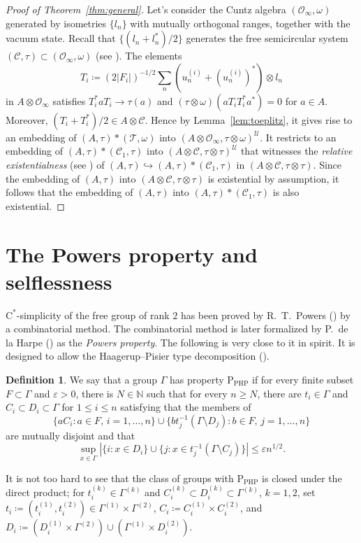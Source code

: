 \documentclass[12pt,nosumlimits,nonamelimits]{amsart}
\theoremstyle{remark}
\theoremstyle{definition}
\newtheorem*{defn}{Definition}
\newcommand{\IN}{\mathbb{N}}
\newcommand{\cC}{\mathcal{C}}
\newcommand{\cO}{\mathcal{O}}
\newcommand{\cT}{\mathcal{T}}
\newcommand{\cU}{\mathcal{U}}
\newcommand{\ve}{\varepsilon}
\newcommand{\Ga}{\Gamma}
\begin{document}
\begin{proof}[Proof of Theorem~\ref{thm:general}]
Let's consider the Cuntz algebra $(\cO_\infty,\omega)$ 
generated by isometries $\{l_n\}$ with mutually orthogonal ranges, 
together with the vacuum state. 
Recall that  $\{ (l_n+l_n^*)/2\}$ generates 
the free semicircular system 
$(\cC,\tau) \subset (\cO_\infty,\omega)$ 
(see \cite{vdn}). 
The elements 
\[
T_i \coloneq (2|F_i|)^{-1/2}\sum_n (u^{(i)}_n+(u^{(i)}_n)^*) \otimes l_n
\]
in $A\otimes\cO_\infty$ satisfies $T_i^* a T_i \to \tau(a)$ and 
$(\tau\otimes\omega)(aT_iT_i^*a^*)=0$ for $a\in A$. Moreover, 
$(T_i+T_i^*)/2\in A\otimes\cC$. 
Hence by Lemma~\ref{lem:toeplitz}, it gives rise to an embedding 
of $(A,\tau)\ast(\cT,\omega)$ into $(A\otimes\cO_\infty,\tau\otimes\omega)^\cU$.
It restricts to an embedding of 
$(A,\tau)\ast(\cC_1,\tau)$ into $(A\otimes\cC,\tau\otimes\tau)^\cU$ 
that witnesses the \emph{relative existentialness} (see \cite{robert}) 
of $(A,\tau)\hookrightarrow(A,\tau)\ast(\cC_1,\tau)$ 
in $(A\otimes\cC,\tau\otimes\tau)$. 
Since the embedding of $(A,\tau)$ into $(A\otimes\cC,\tau\otimes\tau)$ 
is existential by assumption, it follows that the embedding of $(A,\tau)$ into 
$(A,\tau)\ast(\cC_1,\tau)$ is also existential. 
\end{proof}
%
%
\section{The Powers property and selflessness}\label{sec:pow}
%
%
$\mathrm{C}^*$-simplicity of the free group of rank $2$ 
has been proved by R.~T.~Powers (\cite{powers}) by a combinatorial 
method. The combinatorial method is later formalized by 
P.~de la Harpe (\cite{delaharpe}) as 
the \emph{Powers property}. 
The following is very close to it in spirit. 
It is designed to allow the Haagerup--Pisier 
type decomposition (\cite{hp}).

\begin{defn}\label{defn:pow}
We say that a group $\Ga$ has 
property $\mathrm{P}_{\mathrm{PHP}}$ if 
for every finite subset $F\subset\Ga$ and $\ve>0$, 
there is $N\in\IN$ such that for every $n\geq N$, 
there are 
$t_i\in\Ga$ and $C_i\subset D_i\subset\Ga$ for 
$1\le i \le n$ satisfying that 
the members of 
\[
\{aC_i : a\in F,\, i=1,\ldots,n\}\cup\{ bt_j^{-1}(\Gamma\setminus D_j) : b\in F,\, j=1,\ldots,n\}
\] 
are mutually disjoint and that 
\[
\sup_{x\in\Ga} |\{ i : x\in D_i \} \cup \{ j : x \in t_j^{-1} (\Ga\setminus C_j)\}| \le \ve n^{1/2}.
\]
\end{defn}

It is not too hard to see that the class of groups 
with $\mathrm{P}_{\mathrm{PHP}}$ is closed 
under the direct product; for $t_i^{(k)}\in\Ga^{(k)}$ and 
$C_i^{(k)}\subset D_i^{(k)}\subset\Ga^{(k)}$, $k=1,2$, 
set $t_i \coloneq (t_i^{(1)},t_i^{(2)})\in \Ga^{(1)}\times \Ga^{(2)}$, 
$C_i \coloneq C_i^{(1)}\times C_i^{(2)}$, and 
$D_i \coloneq (D_i^{(1)}\times \Ga^{(2)})\cup(\Ga^{(1)}\times D_i^{(2)})$. 
\end{document}
